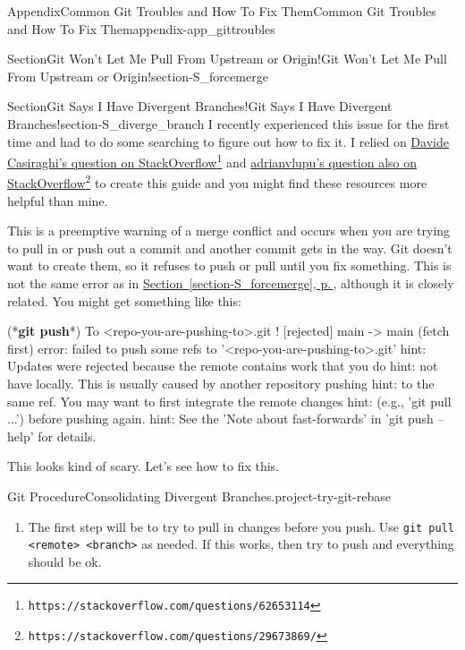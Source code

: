 \documentclass[twoside,10pt,]{book}
\newcommand{\xreffont}{\relax}
\newcommand{\mono}[1]{\texttt{#1}}
\newcommand{\consoleinput}[1]{\textbf{#1}}
\begin{document}
\begin{appendixptx}{Appendix}{Common Git Troubles and How To Fix Them}{}{Common Git Troubles and How To Fix Them}{}{}{appendix-app_gittroubles}
\begin{sectionptx}{Section}{Git Won't Let Me Pull From Upstream or Origin!}{}{Git Won't Let Me Pull From Upstream or Origin!}{}{}{section-S_forcemerge}
\end{sectionptx}
%
%
\typeout{************************************************}
\typeout{************************************************}
%
\begin{sectionptx}{Section}{Git Says I Have Divergent Branches!}{}{Git Says I Have Divergent Branches!}{}{}{section-S_diverge_branch}
I recently experienced this issue for the first time and had to do some searching to figure out how to fix it. I relied on \href{https://stackoverflow.com/questions/62653114}{Davide Casiraghi's question on StackOverflow}\footnote{\nolinkurl{https://stackoverflow.com/questions/62653114}\label{fn-S_diverge_branch-b-b}} and \href{https://stackoverflow.com/questions/29673869/}{adrianvlupu's question also on StackOverflow}\footnote{\nolinkurl{https://stackoverflow.com/questions/29673869/}\label{fn-S_diverge_branch-b-d}} to create this guide and you might find these resources more helpful than mine.%
\par
This is a preemptive warning of a merge conflict and occurs when you are trying to pull in or push out a commit and another commit gets in the way. Git doesn't want to create them, so it refuses to push or pull until you fix something. This is not the same error as in \hyperref[section-S_forcemerge]{Section~{\xreffont\ref{section-S_forcemerge}}, p.\,\pageref{section-S_forcemerge}}, although it is closely related. You might get something like this:%
\begin{console}{0}{1}{0}
(*\consoleinput{git push}*)
To <repo-you-are-pushing-to>.git
 ! [rejected]        main -> main (fetch first)
error: failed to push some refs to '<repo-you-are-pushing-to>.git'
hint: Updates were rejected because the remote contains work that you do
hint: not have locally. This is usually caused by another repository pushing
hint: to the same ref. You may want to first integrate the remote changes
hint: (e.g., 'git pull ...') before pushing again.
hint: See the 'Note about fast-forwards' in 'git push --help' for details.
\end{console}
This looks kind of scary. Let's see how to fix this.%
\begin{project}{Git Procedure}{Consolidating Divergent Branches.}{project-try-git-rebase}%
\begin{enumerate}[font=\bfseries,label=(\alph*),ref=\alph*]%
\item{}The first step will be to try to pull in changes before you push. Use \mono{git pull <remote> <branch>} as needed. If this works, then try to push and everything should be ok.%

\end{enumerate}
\end{project}
\end{sectionptx}
\end{appendixptx}
\end{document}
